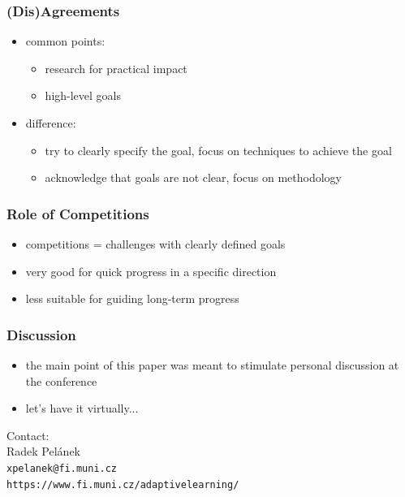 \documentclass[bigger]{beamer}
\begin{document}
\begin{frame}
  \frametitle{(Dis)Agreements}

  \begin{itemize}
  \item common points:
    \begin{itemize}
    \item research for practical impact
    \item high-level goals
    \end{itemize}
  \item difference:
    \begin{itemize}
    \item try to clearly specify the goal, focus on techniques to achieve the
      goal
    \item acknowledge that goals are not clear, focus on methodology
    \end{itemize}
  \end{itemize}
\end{frame}

\begin{frame}
  \frametitle{Role of Competitions}

  \begin{itemize}
  \item competitions = challenges with clearly defined goals
  \item very good for quick progress in a specific direction
  \item less suitable for guiding long-term progress
  \end{itemize}
\end{frame}

\begin{frame}
  \frametitle{Discussion}

  \begin{itemize}
  \item the main point of this paper was meant to stimulate personal discussion
    at the conference
  \item let's have it virtually...
  \end{itemize}

  \bigskip

  {\small
  Contact:\\
  Radek Pel\'anek\\
  \texttt{xpelanek@fi.muni.cz}\\
  \texttt{https://www.fi.muni.cz/adaptivelearning/}
}
\end{frame}
\end{document}
